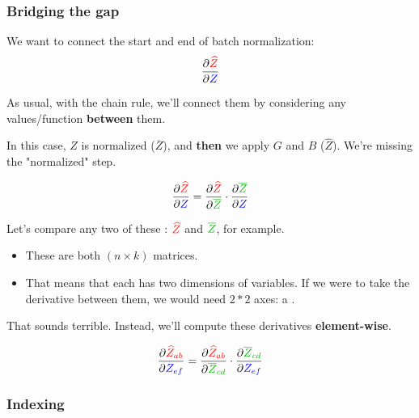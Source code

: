         \subsubsection{Bridging the gap}

            We want to connect the start and end of batch normalization:\\

            \begin{equation}
                \frac{\partial \textcolor{red}{\widehat{Z}}}{\partial \textcolor{blue}{Z}}
            \end{equation}

            As usual, with the chain rule, we'll connect them by considering any values/function \textbf{between} them.

            In this case, $Z$ is normalized ($\overline{Z}$), and \textbf{then} we apply $G$ and $B$ ($\widehat{Z}$). We're missing the "normalized" step.

            \begin{equation}
                \pderiv{\red{\widehat{Z}}}{\blu{Z}} = 
                \pderiv{\red{\widehat{Z}}}{\grn{\overline{Z}}} \cdot \pderiv{\grn{\overline{Z}}}{\blu{Z}}
            \end{equation}

            Let's compare any two of these : $\textcolor{red}{\widehat{Z}}$ and $\grn{\overline{Z}}$, for example.

            \begin{itemize}
                \item These are both $(n \times k)$ matrices.
                \item That means that each has two dimensions of variables. If we were to take the derivative between them, we would need $2*2$ axes: a .
            \end{itemize}

            That sounds terrible. Instead, we'll compute these derivatives \textbf{element-wise}.

            \begin{equation}
                \pderiv{ \red{\widehat{Z}_{ab}} }{ \blu{Z_{ef}} } = 
                \pderiv{ \red{\widehat{Z}_{ab}} }{ \grn{\overline{Z}_{cd} } } \cdot 
                \pderiv{ \grn{\overline{Z}_{cd}} }{ \blu{Z_{ef}} }
            \end{equation}

            \subsecdiv

        \subsubsection{Indexing}

